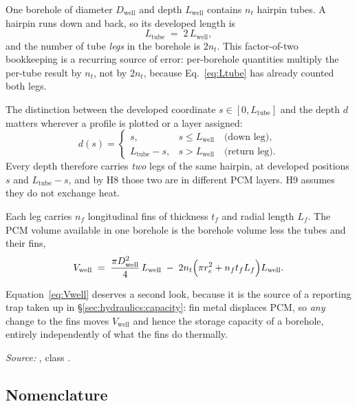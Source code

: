 One borehole of diameter $D_{\mathrm{well}}$ and depth $L_{\mathrm{well}}$
contains $n_{t}$ hairpin tubes. A hairpin runs down and back, so its developed
length is
\begin{equation}
  L_{\mathrm{tube}} \;=\; 2\,L_{\mathrm{well}},
  \label{eq:Ltube}
\end{equation}
and the number of tube \emph{legs} in the borehole is $2n_{t}$. This
factor-of-two bookkeeping is a recurring source of error: per-borehole
quantities multiply the per-tube result by $n_{t}$, not by $2n_{t}$, because
Eq.~\eqref{eq:Ltube} has already counted both legs.

The distinction between the developed coordinate $s\in[0,L_{\mathrm{tube}}]$
and the depth $d$ matters wherever a profile is plotted or a layer assigned:
\begin{equation}
  d(s) =
  \begin{cases}
    s, & s \le L_{\mathrm{well}} \quad\text{(down leg)},\\
    L_{\mathrm{tube}} - s, & s > L_{\mathrm{well}} \quad\text{(return leg)}.
  \end{cases}
  \label{eq:depth-fold}
\end{equation}
Every depth therefore carries \emph{two} legs of the same hairpin, at developed
positions $s$ and $L_{\mathrm{tube}}-s$, and by H8 those two are in different
PCM layers. H9 assumes they do not exchange heat.

Each leg carries $n_{f}$ longitudinal fins of thickness $t_{f}$ and radial
length $L_{f}$. The PCM volume available in one borehole is the borehole volume
less the tubes and their fins,
\begin{equation}
  V_{\mathrm{well}}
  \;=\;
  \frac{\pi D_{\mathrm{well}}^{2}}{4}\,L_{\mathrm{well}}
  \;-\;
  2n_{t}\Bigl(\pi r_{e}^{2} + n_{f} t_{f} L_{f}\Bigr) L_{\mathrm{well}} .
  \label{eq:Vwell}
\end{equation}

Equation~\eqref{eq:Vwell} deserves a second look, because it is the source of a
reporting trap taken up in \S\ref{sec:hydraulics:capacity}: fin metal displaces
PCM, so \emph{any} change to the fins moves $V_{\mathrm{well}}$ and hence the
storage capacity of a borehole, entirely independently of what the fins do
thermally.

\emph{Source:} , class .

\subsection{Nomenclature}


